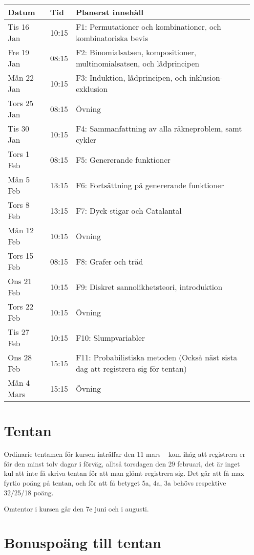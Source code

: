 \documentclass{tufte-handout}
\begin{document}
\begin{table}[h]
\begin{tabularx}{\textwidth}{llX}
Datum & Tid      & Planerat innehåll \\ 
\midrule
Tis 16 Jan &10:15 & F1: Permutationer och kombinationer, och kombinatoriska bevis\\
Fre 19 Jan &08:15 & F2: Binomialsatsen, kompositioner, multinomialsatsen, och lådprincipen\\
Mån 22 Jan &10:15 & F3: Induktion, lådprincipen, och inklusion-exklusion\\
Tors 25 Jan &08:15 & Övning\\
Tis 30 Jan &10:15 & F4: Sammanfattning av alla räkneproblem, samt cykler\\
Tors 1 Feb &08:15 & F5: Genererande funktioner\\
Mån 5 Feb &13:15 & F6: Fortsättning på genererande funktioner\\
Tors 8 Feb &13:15 & F7: Dyck-stigar och Catalantal\\
Mån 12 Feb &10:15 & Övning\\
Tors 15 Feb &08:15 & F8: Grafer och träd\\
Ons 21 Feb &10:15 & F9: Diskret sannolikhetsteori, introduktion\\
Tors 22 Feb &10:15 & Övning\\
Tis 27 Feb &10:15 & F10: Slumpvariabler\\
Ons 28 Feb &15:15 & F11: Probabilistiska metoden (Också näst sista dag att registrera sig för tentan)\\
Mån 4 Mars &15:15 & Övning
\end{tabularx}
\end{table}

\section{Tentan}

Ordinarie tentamen för kursen inträffar den 11 mars -- kom ihåg att registrera er för den minst tolv dagar i förväg, alltså torsdagen den 29 februari, det är inget kul att inte få skriva tentan för att man glömt registrera sig. Det går att få max fyrtio poäng på tentan, och för att få betyget 5a, 4a, 3a behövs respektive 32/25/18 poäng.

Omtentor i kursen går den 7e juni och i augusti.

\section{Bonuspoäng till tentan}
\end{document}
